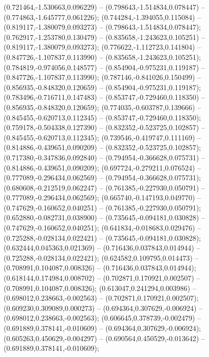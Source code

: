  (0.721464,-1.530663,0.096229) -- (0.798643,-1.514834,0.078447) -- (0.774863,-1.645777,0.061226);
 (0.744284,-1.394055,0.115084) -- (0.819117,-1.380079,0.093273) -- (0.798643,-1.514834,0.078447);
 (0.762917,-1.253780,0.130479) -- (0.835658,-1.243623,0.105251) -- (0.819117,-1.380079,0.093273);
 (0.776622,-1.112723,0.141804) -- (0.847726,-1.107837,0.113990) -- (0.835658,-1.243623,0.105251);
 (0.784819,-0.974056,0.148577) -- (0.854904,-0.975231,0.119187) -- (0.847726,-1.107837,0.113990);
 (0.787146,-0.841026,0.150499) -- (0.856935,-0.848320,0.120659) -- (0.854904,-0.975231,0.119187);
 (0.783496,-0.716711,0.147483) -- (0.853747,-0.729460,0.118350) -- (0.856935,-0.848320,0.120659);
 (0.774035,-0.603787,0.139666) -- (0.845455,-0.620713,0.112345) -- (0.853747,-0.729460,0.118350);
 (0.759178,-0.504338,0.127390) -- (0.832352,-0.523725,0.102857) -- (0.845455,-0.620713,0.112345);
 (0.739546,-0.419747,0.111169) -- (0.814886,-0.439651,0.090209) -- (0.832352,-0.523725,0.102857);
 (0.717380,-0.347836,0.092840) -- (0.794954,-0.366628,0.075731) -- (0.814886,-0.439651,0.090209);
 (0.697724,-0.279211,0.076524) -- (0.777089,-0.296434,0.062569) -- (0.794954,-0.366628,0.075731);
 (0.680608,-0.212519,0.062247) -- (0.761385,-0.227930,0.050791) -- (0.777089,-0.296434,0.062569);
 (0.665740,-0.147193,0.049770) -- (0.747629,-0.160652,0.040251) -- (0.761385,-0.227930,0.050791);
 (0.652880,-0.082731,0.038900) -- (0.735645,-0.094181,0.030828) -- (0.747629,-0.160652,0.040251);
 (0.641834,-0.018683,0.029476) -- (0.725288,-0.028134,0.022421) -- (0.735645,-0.094181,0.030828);
 (0.632444,0.045363,0.021369) -- (0.716436,0.037843,0.014944) -- (0.725288,-0.028134,0.022421);
 (0.624582,0.109795,0.014473) -- (0.708991,0.104087,0.008326) -- (0.716436,0.037843,0.014944);
 (0.618144,0.174984,0.008702) -- (0.702871,0.170921,0.002507) -- (0.708991,0.104087,0.008326);
 (0.613047,0.241294,0.003986) -- (0.698012,0.238663,-0.002563) -- (0.702871,0.170921,0.002507);
 (0.609230,0.309089,0.000273) -- (0.694364,0.307629,-0.006924) -- (0.698012,0.238663,-0.002563);
 (0.606645,0.378739,-0.002479) -- (0.691889,0.378141,-0.010609) -- (0.694364,0.307629,-0.006924);
 (0.605263,0.450629,-0.004297) -- (0.690564,0.450529,-0.013642) -- (0.691889,0.378141,-0.010609);
